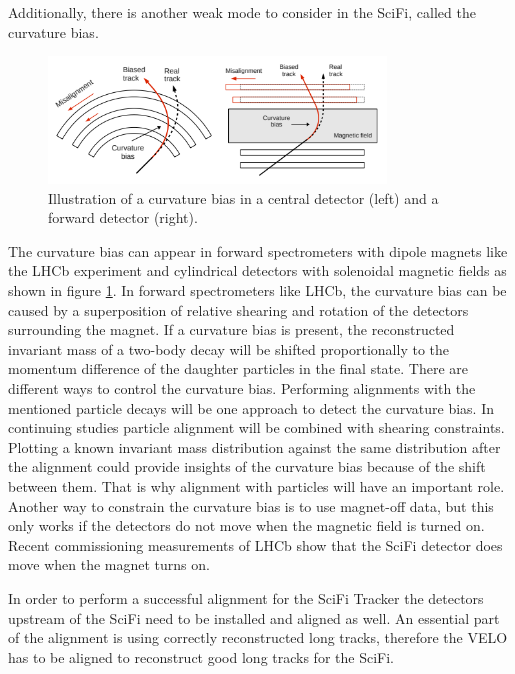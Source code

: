 Additionally, there is another weak mode to consider in the SciFi, called the curvature bias.
\begin{figure}
    \centering
    \includegraphics[width=0.8\textwidth]{plots/curvature_bias.png}
    \caption{Illustration of a curvature bias in a central detector (left) and a forward detector (right).}
    \label{fig:curvature}
\end{figure}
The curvature bias can appear in forward spectrometers with dipole magnets like the LHCb experiment and cylindrical detectors with solenoidal magnetic fields as shown in figure \ref{fig:curvature}.
In forward spectrometers like LHCb, the curvature bias can be caused by a superposition of relative shearing and rotation of the detectors surrounding the magnet. If a curvature bias is present, the reconstructed invariant mass of a two-body decay will be shifted proportionally to the momentum difference of the daughter particles in the final state\cite{1207.4756}.
There are different ways to control the curvature bias.
Performing alignments with the mentioned particle decays will be one approach to detect the curvature bias. In continuing studies particle alignment will be combined with shearing constraints. Plotting a known invariant mass distribution against the same distribution after the alignment could provide insights of the curvature bias because of the shift between them.
That is why alignment with particles will have an important role.
Another way to constrain the curvature bias is to use magnet-off data, but this only works if the detectors do not move when the magnetic field is turned on. Recent commissioning measurements of LHCb show that the SciFi detector does move when the magnet turns on.

In order to perform a successful alignment for the SciFi Tracker the detectors upstream of the SciFi need to be installed and aligned as well.
An essential part of the alignment is using correctly reconstructed long tracks, therefore the VELO has to be aligned to reconstruct good long tracks for the SciFi. 
